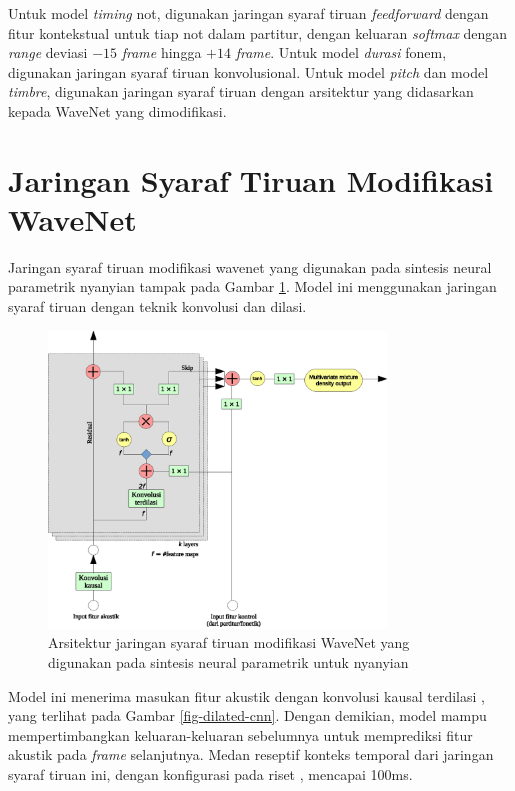 Untuk model \textit{timing} not, digunakan jaringan syaraf tiruan \textit{feedforward} dengan fitur kontekstual untuk tiap not dalam partitur, dengan keluaran \textit{softmax} dengan \textit{range} deviasi $-15$ \textit{frame} hingga $+14$ \textit{frame}. Untuk model \textit{durasi} fonem, digunakan jaringan syaraf tiruan konvolusional. \parencite{bonada2017singing} Untuk model \textit{pitch} dan model \textit{timbre}, digunakan jaringan syaraf tiruan dengan arsitektur yang didasarkan kepada WaveNet \parencite{Oord2016WaveNetAG} yang dimodifikasi.

\section{Jaringan Syaraf Tiruan Modifikasi WaveNet}

Jaringan syaraf tiruan modifikasi wavenet yang digunakan pada sintesis neural parametrik nyanyian tampak pada Gambar \ref{fig-network-architecture-bonada}. \parencite{bonada2017singing} Model ini menggunakan jaringan syaraf tiruan dengan teknik konvolusi dan dilasi.

\begin{figure}[h]
    \centering
    \includegraphics[width=0.8\textwidth]{resources/network-architecture-bonada.eps}
    \caption{Arsitektur jaringan syaraf tiruan modifikasi WaveNet yang digunakan pada sintesis neural parametrik untuk nyanyian\parencite{bonada2017singing}}\label{fig-network-architecture-bonada}
\end{figure}

Model ini menerima masukan fitur akustik dengan konvolusi kausal terdilasi \parencite{Oord2016WaveNetAG}, yang terlihat pada Gambar \ref{fig-dilated-cnn}. Dengan demikian, model mampu mempertimbangkan keluaran-keluaran sebelumnya untuk memprediksi fitur akustik pada \textit{frame} selanjutnya. Medan reseptif konteks temporal dari jaringan syaraf tiruan ini, dengan konfigurasi pada riset \citet{bonada2017singing}, mencapai 100ms.

